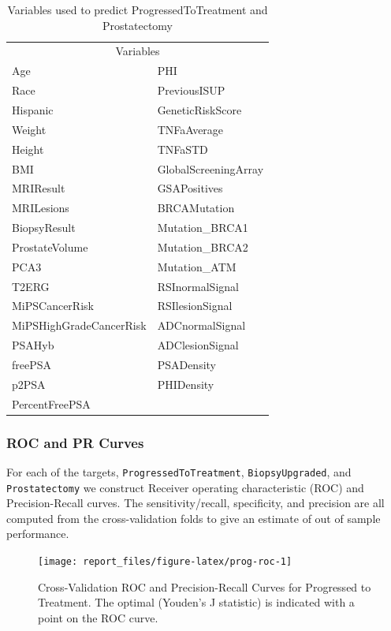 \documentclass[]{article}
\begin{document}
\begin{table}

\caption{\label{tab:variable-set}Variables used to predict ProgressedToTreatment and Prostatectomy}
\centering
\begin{tabular}[t]{ll}
\toprule
\multicolumn{2}{c}{Variables} \\
\cmidrule(l{3pt}r{3pt}){1-2}
Age & PHI\\
Race & PreviousISUP\\
Hispanic & GeneticRiskScore\\
Weight & TNFaAverage\\
Height & TNFaSTD\\
\addlinespace
BMI & GlobalScreeningArray\\
MRIResult & GSAPositives\\
MRILesions & BRCAMutation\\
BiopsyResult & Mutation\_BRCA1\\
ProstateVolume & Mutation\_BRCA2\\
\addlinespace
PCA3 & Mutation\_ATM\\
T2ERG & RSInormalSignal\\
MiPSCancerRisk & RSIlesionSignal\\
MiPSHighGradeCancerRisk & ADCnormalSignal\\
PSAHyb & ADClesionSignal\\
\addlinespace
freePSA & PSADensity\\
p2PSA & PHIDensity\\
PercentFreePSA & \\
\bottomrule
\end{tabular}
\end{table}

\hypertarget{roc-and-pr-curves}{%
\subsubsection{ROC and PR Curves}\label{roc-and-pr-curves}}

For each of the targets, \texttt{ProgressedToTreatment}, \texttt{BiopsyUpgraded}, and \texttt{Prostatectomy} we construct Receiver operating characteristic (ROC) and Precision-Recall curves.
The sensitivity/recall, specificity, and precision are all computed from the cross-validation folds to give an estimate of out of sample performance.

\begin{figure}

{\centering \texttt{[image: report\_files/figure-latex/prog-roc-1]} 

}

\caption{Cross-Validation ROC and Precision-Recall Curves for Progressed to Treatment. The optimal (Youden's J statistic) is indicated with a point on the ROC curve.}\label{fig:prog-roc}
\end{figure}
\end{document}

